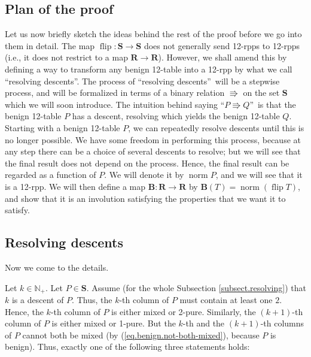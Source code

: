\documentclass[numbers=enddot,12pt,final,onecolumn,notitlepage]{scrartcl}%
\theoremstyle{definition}
\begin{document}
\subsection{Plan of the proof}

Let us now briefly sketch the ideas behind the rest of the proof before we go
into them in detail. The map $\operatorname*{flip}:\mathbf{S}\rightarrow
\mathbf{S}$ does not generally send 12-rpps to 12-rpps (i.e., it does not
restrict to a map $\mathbf{R}\rightarrow\mathbf{R}$). However, we shall amend
this by defining a way to transform any benign 12-table into a 12-rpp by what
we call \textquotedblleft resolving descents\textquotedblright. The process of
\textquotedblleft resolving descents\textquotedblright\ will be a stepwise
process, and will be formalized in terms of a binary relation $\Rrightarrow$
on the set $\mathbf{S}$ which we will soon introduce. The intuition behind
saying \textquotedblleft$P\Rrightarrow Q$\textquotedblright\ is that the
benign 12-table $P$ has a descent, resolving which yields the benign 12-table
$Q$. Starting with a benign 12-table $P$, we can repeatedly resolve descents
until this is no longer possible. We have some freedom in
performing this process, because at any step there can be a choice of several
descents to resolve; but we will see that the final result does not depend on
the process. Hence, the final result can be regarded as a function of $P$. We
will denote it by $\operatorname*{norm}P$, and we will see that it is a
12-rpp. We will then define a map $\mathbf{B}:\mathbf{R}\rightarrow\mathbf{R}$
by $\mathbf{B}\left(  T\right)  =\operatorname*{norm}\left(
\operatorname*{flip}T\right)  $, and show that it is an involution satisfying
the properties that we want it to satisfy.

\subsection{\label{subsect.resolving}Resolving descents}

Now we come to the details.

Let $k\in\mathbb{N}_{+}$. Let $P\in\mathbf{S}$. Assume (for the whole Subsection \ref{subsect.resolving}) that $k$
is a descent of $P$. Thus, the $k$-th column of $P$ must contain at least one
$2$. Hence, the $k$-th column of $P$ is either mixed or 2-pure. Similarly, the
$\left(  k+1\right)  $-th column of $P$ is either mixed or 1-pure. But the
$k$-th and the $\left(  k+1\right)  $-th columns of $P$ cannot both be mixed
(by (\ref{eq.benign.not-both-mixed}), because $P$ is benign). Thus,
exactly one of the following three statements holds:
\end{document}
